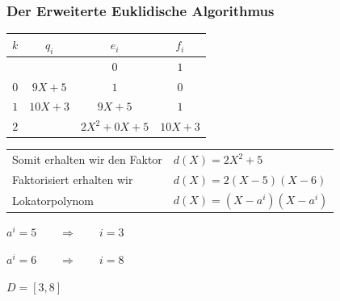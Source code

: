 \documentclass[11pt,aspectratio=169]{beamer}
\begin{document}
	\begin{frame}
		\frametitle{Der Erweiterte Euklidische Algorithmus}
		
		\begin{center}
			
		\begin{tabular}{| c | c | c c |}
			\hline
			$k$ &  $q_i$ & $e_i$ & $f_i$\\
			\hline 
			& & $0$& $1$\\
			$0$& $9X + 5$& $1$& $0$\\
			$1$& $10X + 3$& $9X+5$& $1$\\
			$2$& & $2X^2 + 0X + 5$& $10X + 3$\\
			\hline
		\end{tabular}	
			
		\end{center}
		
		\vspace{10pt}
		
		\begin{tabular}{ll}
			Somit erhalten wir den Faktor& $d(X) = 2X^2 + 5$\\
			Faktorisiert erhalten wir& $d(X) = 2(X-5)(X-6)$\\
			Lokatorpolynom& $d(X) = (X-a^i)(X-a^i)$
		\end{tabular}
		
		\vspace{10pt}
		
		\begin{center}
			$a^i = 5 \qquad \Rightarrow \qquad i = 3$
			
			$a^i = 6 \qquad \Rightarrow \qquad i = 8$
		\end{center}
		
	$D = [3,8]$
		
	\end{frame}
\end{document}
